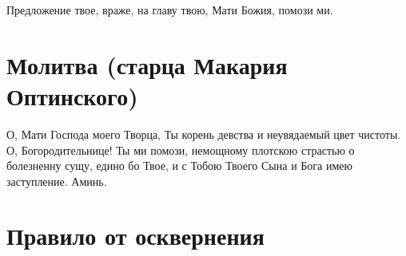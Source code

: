 \tolkopoblagosloveniyu

Предложение твое, враже, на главу твою, Мати Божия, помози ми. 


\section{Молитва (старца Макария Оптинского)}

\tolkopoblagosloveniyu

\begin{mymulticols}

О, Мати Господа моего Творца, Ты корень девства и неувядаемый цвет чистоты. О, Богородительнице! Ты ми помози, немощному плотскою страстью о болезненну сущу, едино бо Твое, и с Тобою Твоего Сына и Бога имею заступление. Аминь.

\end{mymulticols}

\section{Правило от осквернения}

\tolkopoblagosloveniyu

